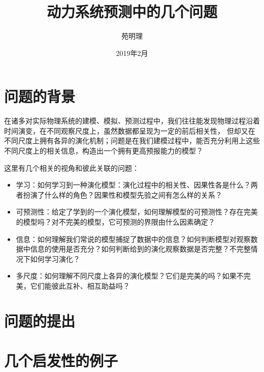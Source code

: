 \documentclass[a4paper,12pt]{article}
\title{动力系统预测中的几个问题}
\author{苑明理}
\date{2019年2月}
\begin{document}
\maketitle{}

\renewcommand\contentsname{目录}
\setcounter{tocdepth}{2}
\tableofcontents

\newpage

\section{问题的背景}

在诸多对实际物理系统的建模、模拟、预测过程中，我们往往能发现物理过程沿着时间演变，在不同观察尺度上，虽然数据都呈现为一定的前后相关性，
但却又在不同尺度上拥有各异的演化机制；问题是在我们建模过程中，能否充分利用上这些不同尺度上的相关信息，构造出一个拥有更高预报能力的模型？

这里有几个相关的视角和彼此关联的问题：
\begin{itemize}
\item 学习：如何学习到一种演化模型：演化过程中的相关性、因果性各是什么？两者扮演了什么样的角色？因果性和模型先验之间有怎么样的关系？
\item 可预测性：给定了学到的一个演化模型，如何理解模型的可预测性？存在完美的模型吗？对不完美的模型，它可预测的界限由什么因素确定？
\item 信息：如何理解我们常说的模型捕捉了数据中的信息？如何判断模型对观察数据中信息的使用是否充分？如何判断给到的演化观察数据是否完整？不完整情况下如何学习演化？
\item 多尺度：如何理解不同尺度上各异的演化模型？它们是完美的吗？如果不完美，它们能彼此互补、相互助益吗？
\end{itemize}

\section{问题的提出}

\section{几个启发性的例子}
\end{document}
